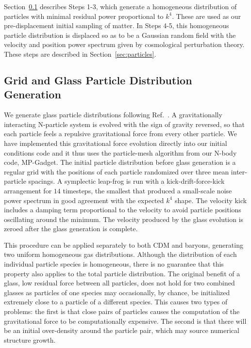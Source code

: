 \documentclass[a4paper,11pt]{article}
\begin{document}
Section~\ref{sec:glass} describes Steps 1-3, which generate a homogeneous distribution of particles with minimal residual power proportional to $k^4$. These are used as our pre-displacement initial sampling of matter. In Steps 4-5, this homogeneous particle distribution is displaced so as to be a Gaussian random field with the velocity and position power spectrum given by cosmological perturbation theory. These steps are described in Section~\ref{sec:particles}.

\subsection{Grid and Glass Particle Distribution Generation}
\label{sec:glass}

We generate glass particle distributions following Ref.~\cite{White:1994}. A gravitationally interacting N-particle system is evolved with the sign of gravity reversed, so that each particle feels a repulsive gravitational force from every other particle. We have implemented this gravitational force evolution directly into our initial conditions code and it thus uses the particle-mesh algorithm from our N-body code, MP-Gadget. The initial particle distribution before glass generation is a regular grid with the positions of each particle randomized over three mean inter-particle spacings. A symplectic leap-frog is run with a kick-drift-force-kick arrangement for $14$ timesteps, the smallest that produced a small-scale noise power spectrum in good agreement with the expected $k^4$ shape. The velocity kick includes a damping term proportional to the velocity to avoid particle positions oscillating around the minimum. The velocity produced by the glass evolution is zeroed after the glass generation is complete.

This procedure can be applied separately to both CDM and baryons, generating two uniform homogeneous gas distributions.
Although the distribution of each individual particle species is homogeneous, there is no guarantee that this property also applies to the total particle distribution. The original benefit of a glass, low residual force between all particles, does not hold for two combined glasses \cite{Yoshida:2003} as particles of one species may occasionally, by chance, be initialized extremely close to a particle of a different species. This causes two types of problems: the first is that close pairs of particles causes the computation of the gravitational force to be computationally expensive. The second is that there will be an initial over-density around the particle pair, which may source numerical structure growth.
\end{document}
